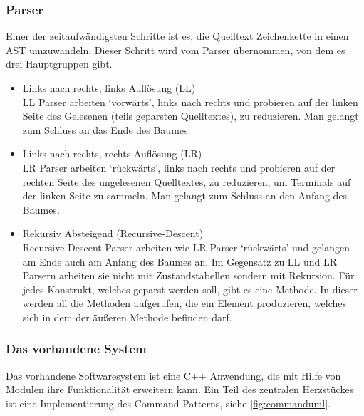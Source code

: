     \subsubsection{Parser}
    \label{sssec:Parser}
      Einer der zeitaufwändigsten Schritte ist es, die Quelltext Zeichenkette in einen AST umzuwandeln. Dieser Schritt wird vom Parser übernommen, von dem es drei Hauptgruppen gibt.
      \begin{itemize}
        \item Links nach rechts, links Auflösung (LL) \autocite[S.77\,f.]{eirund2013formale}\\
          LL Parser arbeiten `vorwärts', links nach rechts und probieren auf der linken Seite des Gelesenen (teils geparsten Quelltextes), zu reduzieren. Man gelangt zum Schluss an das Ende des Baumes.
        \item Links nach rechts, rechts Auflösung (LR) \autocite[S.77\,f.]{eirund2013formale}\\
          LR Parser arbeiten `rückwärts', links nach rechts und probieren auf der rechten Seite des ungelesenen Quelltextes, zu reduzieren, um Terminals auf der linken Seite zu sammeln. Man gelangt zum Schluss an den Anfang des Baumes. \autocite{cs143-stanford}
        \item Rekursiv Absteigend (Recursive-Descent)\\
          Recursive-Descent Parser arbeiten wie LR Parser `rückwärts' und gelangen am Ende auch am Anfang des Baumes an. Im Gegensatz zu LL und LR Parsern arbeiten sie nicht mit Zustandstabellen sondern mit Rekursion. Für jedes Konstrukt, welches geparst werden soll, gibt es eine Methode. In dieser werden all die Methoden aufgerufen, die ein Element produzieren, welches sich in dem der äußeren Methode befinden darf.
      \end{itemize}

    \subsubsection{Das vorhandene System}
    \label{sssec:Das vorhandene System}
      Das vorhandene Softwaresystem ist eine C++ Anwendung, die mit Hilfe von Modulen ihre Funktionalität erweitern kann. Ein Teil des zentralen Herzstückes ist eine Implementierung des Command-Patterns, siehe \autoref{fig:commanduml}.


